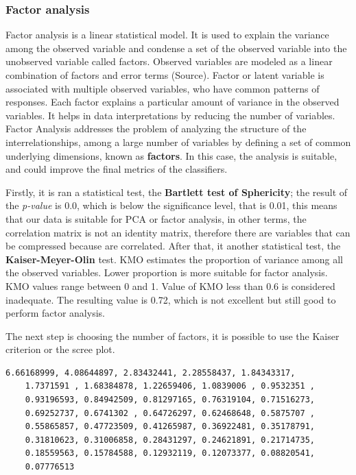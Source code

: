 \subsubsection{Factor analysis}

Factor analysis is a linear statistical model. It is used to explain the variance among the observed variable and condense a set of the observed variable into the unobserved variable called factors. Observed variables are modeled as a linear combination of factors and error terms (Source). Factor or latent variable is associated with multiple observed variables, who have common patterns of responses. Each factor explains a particular amount of variance in the observed variables. It helps in data interpretations by reducing the number of variables.
Factor Analysis addresses the problem of analyzing the structure of the interrelationships, among a large number of variables by defining a set of common underlying dimensions, known as \textbf{factors}. In this case, the analysis is suitable, and could improve the final metrics of the classifiers.

Firstly, it is ran a statistical test, the \textbf{Bartlett test of Sphericity}; the result of the \textit{p-value} is 0.0, which is below the significance level, that is 0.01, this means that our data is suitable for PCA or factor analysis, in other terms, the correlation matrix is not an identity matrix, therefore there are variables that can be compressed because are correlated.
After that, it another statistical test, the \textbf{Kaiser-Meyer-Olin} test. KMO estimates the proportion of variance among all the observed variables. Lower proportion is more suitable for factor analysis. KMO values range between 0 and 1. Value of KMO less than 0.6 is considered inadequate. The resulting value is 0.72, which is not excellent but still good to perform factor analysis.

The next step is choosing the number of factors, it is possible to use the Kaiser criterion or the scree plot.

\begin{lstlisting}[caption=Eigenvalues vector, label=lst:eig, numbers=none]
    6.66168999, 4.08644897, 2.83432441, 2.28558437, 1.84343317,
    1.7371591 , 1.68384878, 1.22659406, 1.0839006 , 0.9532351 ,
    0.93196593, 0.84942509, 0.81297165, 0.76319104, 0.71516273,
    0.69252737, 0.6741302 , 0.64726297, 0.62468648, 0.5875707 ,
    0.55865857, 0.47723509, 0.41265987, 0.36922481, 0.35178791,
    0.31810623, 0.31006858, 0.28431297, 0.24621891, 0.21714735,
    0.18559563, 0.15784588, 0.12932119, 0.12073377, 0.08820541,
    0.07776513
\end{lstlisting}

